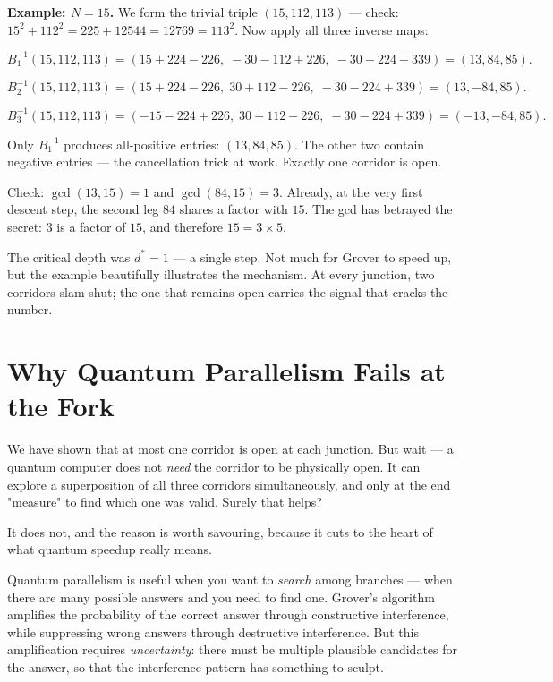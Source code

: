 \documentclass[11pt,twoside,openright]{book}
\theoremstyle{definition}
\theoremstyle{remark}
\begin{document}
\textbf{Example: $N = 15$.} We form the trivial triple $(15, 112, 113)$ --- check: $15^2 + 112^2 = 225 + 12544 = 12769 = 113^2$. Now apply all three inverse maps:

\[B_1^{-1}(15, 112, 113) = (15 + 224 - 226,\; -30 - 112 + 226,\; -30 - 224 + 339) = (13, 84, 85).\]

\[B_2^{-1}(15, 112, 113) = (15 + 224 - 226,\; 30 + 112 - 226,\; -30 - 224 + 339) = (13, -84, 85).\]

\[B_3^{-1}(15, 112, 113) = (-15 - 224 + 226,\; 30 + 112 - 226,\; -30 - 224 + 339) = (-13, -84, 85).\]

Only $B_1^{-1}$ produces all-positive entries: $(13, 84, 85)$. The other two contain negative entries --- the cancellation trick at work. Exactly one corridor is open.

Check: $\gcd(13, 15) = 1$ and $\gcd(84, 15) = 3$. Already, at the very first descent step, the second leg $84$ shares a factor with $15$. The gcd has betrayed the secret: $3$ is a factor of $15$, and therefore $15 = 3 \times 5$.

The critical depth was $d^* = 1$ --- a single step. Not much for Grover to speed up, but the example beautifully illustrates the mechanism. At every junction, two corridors slam shut; the one that remains open carries the signal that cracks the number.



\section{Why Quantum Parallelism Fails at the Fork}

We have shown that at most one corridor is open at each junction. But wait --- a quantum computer does not \textit{need} the corridor to be physically open. It can explore a superposition of all three corridors simultaneously, and only at the end "measure" to find which one was valid. Surely that helps?

It does not, and the reason is worth savouring, because it cuts to the heart of what quantum speedup really means.

Quantum parallelism is useful when you want to \textit{search} among branches --- when there are many possible answers and you need to find one. Grover's algorithm amplifies the probability of the correct answer through constructive interference, while suppressing wrong answers through destructive interference. But this amplification requires \textit{uncertainty}: there must be multiple plausible candidates for the answer, so that the interference pattern has something to sculpt.
\end{document}
